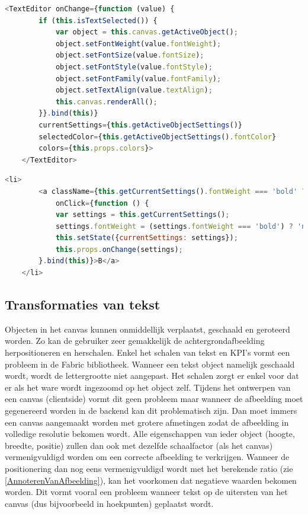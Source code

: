 \begin{lstlisting}[caption={Theme component - Text editor},label=lst:ThemeComponentTextEditor,language=javascript]
	<TextEditor onChange={function (value) {
		if (this.isTextSelected()) {
			var object = this.canvas.getActiveObject();
			object.setFontWeight(value.fontWeight);
			object.setFontSize(value.fontSize);
			object.setFontStyle(value.fontStyle);
			object.setFontFamily(value.fontFamily);
			object.setTextAlign(value.textAlign);
			this.canvas.renderAll();
		}}.bind(this)}
		currentSettings={this.getActiveObjectSettings()}
		selectedColor={this.getActiveObjectSettings().fontColor}
		colors={this.props.colors}>
	</TextEditor>
\end{lstlisting}

\begin{lstlisting}[caption={TextEditor component - toggle bold},label=lst:TextEditorComponentBold,language=javascript]
	<li>
		<a className={this.getCurrentSettings().fontWeight === 'bold' ? 'button primary' : 'button'}
			onClick={function () {
			var settings = this.getCurrentSettings();
			settings.fontWeight = (settings.fontWeight === 'bold') ? 'normal' : 'bold';
			this.setState({currentSettings: settings});
			this.props.onChange(settings);
		}.bind(this)}>B</a>
	</li>
\end{lstlisting}


\subsection{Transformaties van tekst}
Objecten in het canvas kunnen onmiddellijk verplaatst, geschaald en geroteerd worden. Zo kan de gebruiker zeer gemakkelijk de achtergrondafbeelding herpositioneren en herschalen. Enkel het schalen van tekst en KPI's vormt een probleem in de Fabric bibliotheek. Wanneer een tekst object namelijk geschaald wordt, wordt de lettergrootte niet aangepast. Het schalen zorgt er enkel voor dat er als het ware wordt ingezoomd op het object zelf. Tijdens het ontwerpen van een canvas (clientside) vormt dit geen probleem maar wanneer de afbeelding moet gegenereerd worden in de backend kan dit problematisch zijn. Dan moet immers een canvas aangemaakt worden met grotere afmetingen zodat de afbeelding in volledige resolutie bekomen wordt.  Alle eigenschappen van ieder object (hoogte, breedte, positie) zullen dan ook met dezelfde schaalfactor (als het canvas) vermenigvuldigd worden om een correcte afbeelding te verkrijgen. Wanneer de positionering dan nog eens vermenigvuldigd wordt met het berekende ratio (zie \ref{AnnoterenVanAfbeelding}), kan het voorkomen dat negatieve waarden bekomen worden. Dit vormt vooral een probleem wanneer tekst op de uitersten van het canvas (dus bijvoorbeeld in hoekpunten) geplaatst wordt. 


